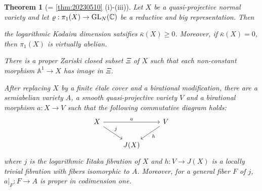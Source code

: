 \documentclass[11pt,english]{smfart}
\theoremstyle{plain}
\newtheorem{thm}{Theorem}[section]
\theoremstyle{definition}
\theoremstyle{remark}
\numberwithin{equation}{subsection}
\theoremstyle{plain}
\newcommand{\bA}{\mathbb{A}}
\newcommand{\bC}{\mathbb{C}}
\begin{document}
\begin{thm}[= \cref{thm:20230510} (i)-(iii)]\label{thm:structure}
	Let $X$ be a quasi-projective normal variety and let $\varrho:\pi_1(X)\to {\rm GL}_N(\bC)$ be a reductive and big representation.   Then 
	\begin{thmlist}
		\item \label{item:LKD} the logarithmic Kodaira dimension satsifies $\bar{\kappa}(X)\geq 0$.
Moreover, if $ \bar{\kappa}(X)= 0$, then $\pi_1(X)$ is virtually abelian.
		\item \label{item:Mori}There is a proper Zariski closed subset $\Xi$ of $X$ such that each non-constant morphism $\bA^1\to X$ has image in $\Xi$.
		\item \label{item:local trivial}After replacing $X$ by a finite \'etale cover and a birational modification, there are a    semiabelian variety $A$, a   smooth quasi-projective variety $V$  and a birational morphism $a:X\to V$  such that the following commutative diagram holds:
		\begin{equation*} 
			\begin{tikzcd}
				X \arrow[rr,    "a"] \arrow[dr, "j"] & & V \arrow[ld, "h"]\\
				& J(X)&
			\end{tikzcd}
		\end{equation*}
		where $j$ is the logarithmic Iitaka fibration of $X$ and $h:V\to J(X)$ is a  locally trivial fibration with fibers isomorphic to $A$.  Moreover, for a   general fiber $F$ of $j$, $a|_{F}:F\to A$ is proper in codimension one.  
	\end{thmlist}   
\end{thm}    
\end{document}
